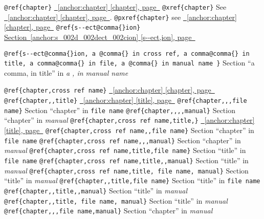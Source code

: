 \documentclass{book}
\begin{document}
\texttt{@ref\{chapter\}} \hyperref[anchor:chapter]{\chaptername~\ref*{anchor:chapter} [chapter], page~\pageref*{anchor:chapter}}
\texttt{@xref\{chapter\}} See \hyperref[anchor:chapter]{\chaptername~\ref*{anchor:chapter} [chapter], page~\pageref*{anchor:chapter}}.
\texttt{@pxref\{chapter\}} see \hyperref[anchor:chapter]{\chaptername~\ref*{anchor:chapter} [chapter], page~\pageref*{anchor:chapter}}
\texttt{@ref\{s{-}{-}ect@comma\{\}ion\}} \hyperref[anchor:s_002d_002dect_002cion]{Section~\ref*{anchor:s_002d_002dect_002cion} [s{-}{-}ect,ion], page~\pageref*{anchor:s_002d_002dect_002cion}}

\texttt{@ref\{s{-}{-}ect@comma\{\}ion, a @comma\{\} in cross
ref, a comma@comma\{\} in title, a comma@comma\{\} in file, a @comma\{\} in manual name \}}
Section ``a comma, in title'' in \textit{a , in manual name}

\texttt{@ref\{chapter,cross ref name\}} \hyperref[anchor:chapter]{\chaptername~\ref*{anchor:chapter} [chapter], page~\pageref*{anchor:chapter}}
\texttt{@ref\{chapter,,title\}} \hyperref[anchor:chapter]{\chaptername~\ref*{anchor:chapter} [title], page~\pageref*{anchor:chapter}}
\texttt{@ref\{chapter,,,file name\}} Section ``chapter'' in \texttt{file name}
\texttt{@ref\{chapter,,,,manual\}} Section ``chapter'' in \textit{manual}
\texttt{@ref\{chapter,cross ref name,title,\}} \hyperref[anchor:chapter]{\chaptername~\ref*{anchor:chapter} [title], page~\pageref*{anchor:chapter}}
\texttt{@ref\{chapter,cross ref name,,file name\}} Section ``chapter'' in \texttt{file name}
\texttt{@ref\{chapter,cross ref name,,,manual\}} Section ``chapter'' in \textit{manual}
\texttt{@ref\{chapter,cross ref name,title,file name\}} Section ``title'' in \texttt{file name}
\texttt{@ref\{chapter,cross ref name,title,,manual\}} Section ``title'' in \textit{manual}
\texttt{@ref\{chapter,cross ref name,title, file name, manual\}} Section ``title'' in \textit{manual}
\texttt{@ref\{chapter,,title,file name\}} Section ``title'' in \texttt{file name}
\texttt{@ref\{chapter,,title,,manual\}} Section ``title'' in \textit{manual}
\texttt{@ref\{chapter,,title, file name, manual\}} Section ``title'' in \textit{manual}
\texttt{@ref\{chapter,,,file name,manual\}} Section ``chapter'' in \textit{manual}
\end{document}
